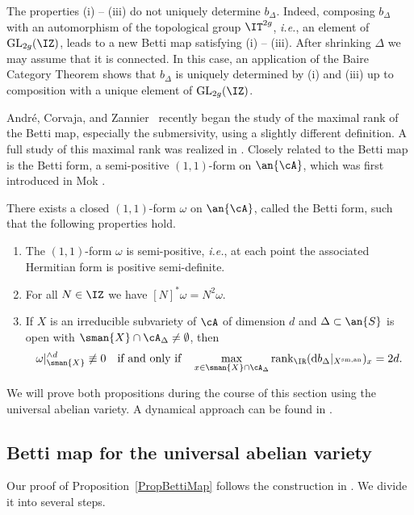 The properties (i) -- (iii) do not uniquely determine $b_\Delta$.
Indeed,  composing $b_\Delta$ with an automorphism of the
topological group $\IT^{2g}$, \textit{i.e.}, an element of
$\mathrm{GL}_{2g}(\IZ)$, leads to a new Betti map satisfying (i) --
(iii). After shrinking   $\Delta$ we may assume that it is connected.
In this case, an application of the
Baire Category Theorem shows that $b_\Delta$ is
uniquely determined by (i) and (iii)
up to composition with a unique element of $\mathrm{GL}_{2g}(\IZ)$.


Andr\'{e}, Corvaja, and Zannier~\cite{ACZBetti} recently began the
study of the maximal rank of the Betti map, especially the submersivity, using a slightly different
definition. A full study of this maximal rank was realized in \cite{GaoBettiRank}. Closely related to the
Betti map is the Betti form, a semi-positive $(1,1)$-form on
$\an{\cA}$, which was first introduced in Mok \cite{Mok11Form}.

\begin{proposition}
\notready\label{PropBettiForm}
There exists a closed $(1,1)$-form $\omega$ on $\an{\cA}$, called the Betti form, such that the following properties hold.
\begin{enumerate}
\item[(i)] The $(1,1)$-form $\omega$ is semi-positive, \textit{i.e.},  at each point
the associated Hermitian form is positive semi-definite.
\item[(ii)] For all $N\in\IZ$ we have $[N]^*\omega = N^2 \omega$.
\item[(iii)] If $X$ is an irreducible subvariety of $\cA$ of dimension
$d$ and $\Delta\subset \an{S}$ is open with $\sman{X}\cap\cA_\Delta\not=\emptyset$, then
\[
\omega|_{\sman{X}}^{\wedge d} \not\equiv 0 \quad\text{if and only
if}\quad  \max_{x \in
\sman{X} \cap \cA_{\Delta}} \mathrm{rank}_{\IR}
(\mathrm{d}b_{\Delta}|_{X^{\mathrm{sm,an}}})_x = 2d. %
\]

\end{enumerate}
\end{proposition}


We will prove both propositions during the course of this section using the universal abelian variety. A dynamical approach can be found in \cite[$\mathsection$2]{CGHX:18}.

\subsection{Betti map for the universal abelian variety}\label{SubsectionBettiMap}
Our proof of Proposition~\ref{PropBettiMap} follows the construction in \cite[$\mathsection$3-$\mathsection$4]{GaoBettiRank}. We divide it into several steps.


